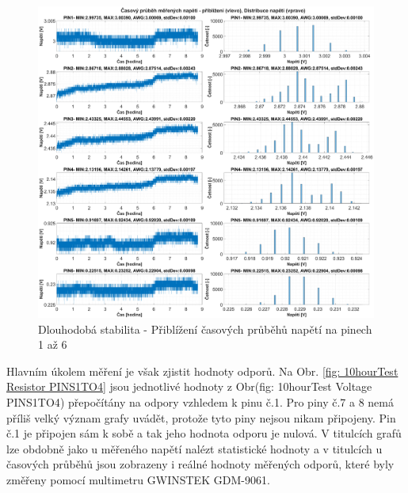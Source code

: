 \begin{figure}[ht!]
    \centering
    \includegraphics[width = 1\textwidth]{obrazky/matlab_generated/VOLTAGE_TESTER/dlouhodoba_stabilita_voltage_part1.eps}
    \caption{Dlouhodobá stabilita - Přiblížení časových průběhů napětí na pinech 1 až 6}
    \label{fig: 10hourTest Voltage PINS1TO4}
\end{figure}

Hlavním úkolem měření je však zjistit hodnoty odporů. Na Obr. \ref{fig: 10hourTest Resistor PINS1TO4}
jsou jednotlivé hodnoty z Obr({fig: 10hourTest Voltage PINS1TO4}) přepočítány na odpory vzhledem k pinu č.1.
Pro piny č.7 a 8 nemá příliš velký význam grafy uvádět, protože tyto piny nejsou nikam připojeny. Pin č.1 je připojen sám k sobě
a tak jeho hodnota odporu je nulová. V titulcích grafů lze obdobně jako u měřeného napětí nalézt statistické hodnoty a 
v titulcích u časových průběhů jsou zobrazeny i reálné hodnoty měřených odporů, které byly změřeny pomocí multimetru
GWINSTEK GDM-9061.\\

